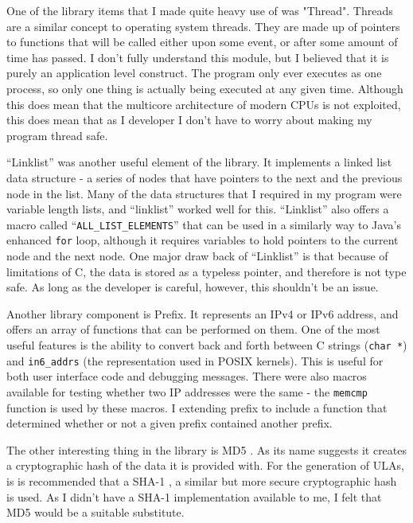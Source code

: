 \documentclass[12pt]{report}
\begin{document}
One of the library items that I made quite heavy use of was "Thread". Threads 
are a similar concept to operating system threads. They are made up of pointers 
to functions that will be called either upon some event, or after some amount of 
time has passed. I don't fully understand this module, but I believed that it is 
purely an application level construct. The program only ever executes as one 
process, so only one thing is actually being executed at any given time. 
Although this does mean that the multicore architecture of modern CPUs 
 is not exploited, this does mean 
that as I developer I don't have to worry about making my program thread safe.

``Linklist'' was another useful element of the library. It implements a linked
list data structure - a series of nodes that have pointers to the next and the
previous node in the list. Many of the data structures that I required in my
program were variable length lists, and ``linklist'' worked well for this.
``Linklist'' also offers a macro called ``\texttt{ALL\_LIST\_ELEMENTS}'' that
can be used in a similarly way to Java's enhanced \texttt{for} loop, although it requires
variables to hold pointers to the current node and the next node. One major
draw back of ``Linklist'' is that because of limitations of C, the data is
stored as a typeless pointer, and therefore is not type safe. As long as the
developer is careful, however, this shouldn't be an issue. 

Another library component is Prefix. It represents an IPv4 or IPv6 address, and
offers an array of functions that can be performed on them. One of the most
useful features is the ability to convert back and forth between C strings
(\texttt{char *}) and \texttt{in6\_addrs} (the representation used in POSIX
kernels). This is useful for both user interface code and debugging messages.
There were also macros available for testing whether two IP addresses were the
same - the \texttt{memcmp} function is used by these macros. I extending prefix
to include a function that determined whether or not a given prefix contained
another prefix. 

The other interesting thing in the library is MD5 
. As its name suggests it creates 
a cryptographic hash of  the data it is provided with. For the generation of 
ULAs, is is recommended that a SHA-1 
, a similar but more secure 
cryptographic hash is used. As I didn't have a SHA-1 implementation available to
me, I felt that MD5 would be a suitable substitute. 
\end{document}
